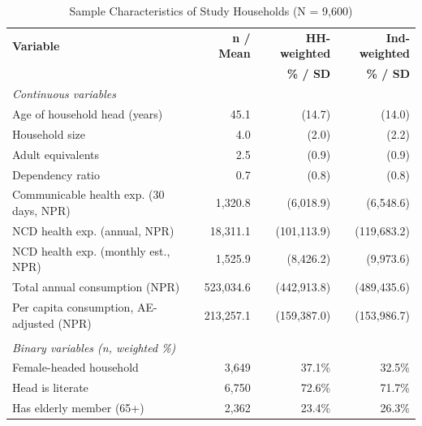


\begin{table}[htbp]
\centering
\caption{Sample Characteristics of Study Households (N = 9,600)}
\label{tab:descriptive}
\small
\begin{tabular}{lrrr}
\hline\hline
\textbf{Variable} & \textbf{n / Mean} & \textbf{HH-weighted} & \textbf{Ind-weighted} \\
 & & \textbf{\% / SD} & \textbf{\% / SD} \\
\hline
\multicolumn{4}{l}{\textit{Continuous variables}} \\
\quad Age of household head (years) & 45.1 & (14.7) & (14.0) \\
\quad Household size & 4.0 & (2.0) & (2.2) \\
\quad Adult equivalents & 2.5 & (0.9) & (0.9) \\
\quad Dependency ratio & 0.7 & (0.8) & (0.8) \\
\quad Communicable health exp. (30 days, NPR) & 1,320.8 & (6,018.9) & (6,548.6) \\
\quad NCD health exp. (annual, NPR) & 18,311.1 & (101,113.9) & (119,683.2) \\
\quad NCD health exp. (monthly est., NPR) & 1,525.9 & (8,426.2) & (9,973.6) \\
\quad Total annual consumption (NPR) & 523,034.6 & (442,913.8) & (489,435.6) \\
\quad Per capita consumption, AE-adjusted (NPR) & 213,257.1 & (159,387.0) & (153,986.7) \\
\\
\multicolumn{4}{l}{\textit{Binary variables (n, weighted \%)}} \\
\quad Female-headed household & 3,649 & 37.1\% & 32.5\% \\
\quad Head is literate & 6,750 & 72.6\% & 71.7\% \\
\quad Has elderly member (65+) & 2,362 & 23.4\% & 26.3\% \\

\end{tabular}
\end{table}
